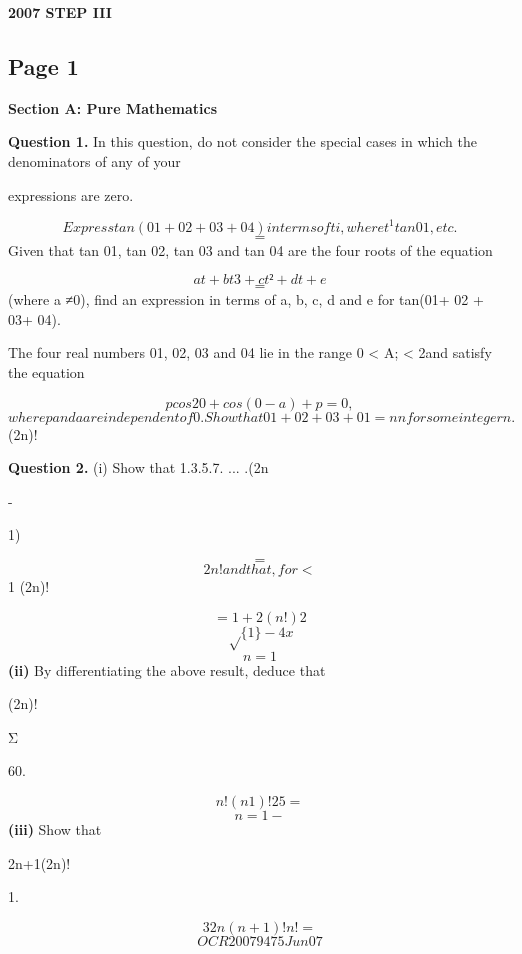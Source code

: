 \documentclass[12pt]{article}
\begin{document}
\begin{center}
{\Large \textbf{2007 STEP III}}
\end{center}

\subsection*{Page 1}
\begin{flushleft}
\bigskip\textbf{Section A: Pure Mathematics}\par
\bigskip\textbf{Question 1.} In this question, do not consider the special cases in which the denominators of any of your\par
expressions are zero.\par
\[Express tan ( 01 + 02+ 03 + 04) in terms of ti, where t^1 tan01, etc.\]
\[=\]
Given that tan 01, tan 02, tan 03 and tan 04 are the four roots of the equation\par
\[at + bt3 + ct² + dt +e\]
\[=\]
(where a ≠0), find an expression in terms of a, b, c, d and e for tan(01+ 02 + 03+ 04).\par
The four real numbers 01, 02, 03 and 04 lie in the range 0 < A; < 2\pi and satisfy the equation\par
\[pcos 20+ cos(0- a) +p= 0,\]
\[where p and a are independent of 0. Show that 01+02+ 03 +01 = nn for some integer n.\]
(2n)!\par
\bigskip\textbf{Question 2.} (i) Show that 1.3.5.7. ... .(2n\par
-\par
1)\par
\[=\]
\[2n! and that, for <\]
1 (2n)!\par
\[=1+2 (n!)2\]
\[\sqrt\{1\}-4x\]
\[n=1\]
\textbf{(ii)} By differentiating the above result, deduce that\par
(2n)!\par
Σ\par
60.\par
\[n! (n 1)! 25 =\]
\[n=1 -\]
\textbf{(iii)} Show that\par
2n+1(2n)!\par
1.\par
\[32n (n+1)! n! =\]
\[OCR 2007 9475 Jun07\]
\end{flushleft}
\end{document}
